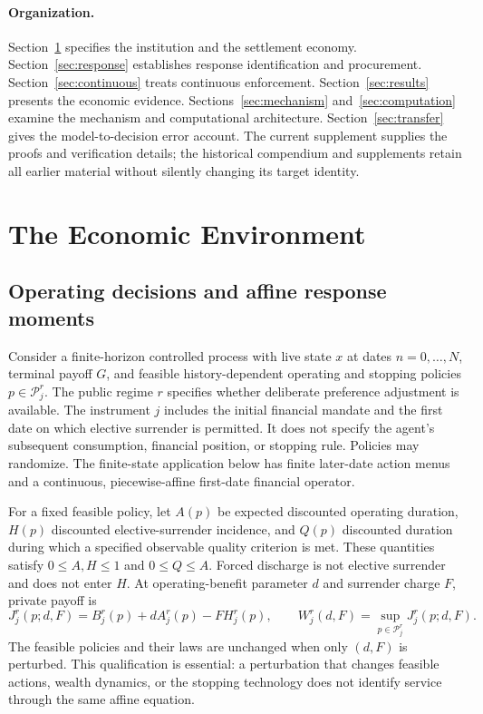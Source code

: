 \paragraph*{Organization.}
Section~\ref{sec:model} specifies the institution and the settlement economy. Section~\ref{sec:response} establishes response identification and procurement. Section~\ref{sec:continuous} treats continuous enforcement. Section~\ref{sec:results} presents the economic evidence. Sections~\ref{sec:mechanism} and~\ref{sec:computation} examine the mechanism and computational architecture. Section~\ref{sec:transfer} gives the model-to-decision error account. The current supplement supplies the proofs and verification details; the historical compendium and supplements retain all earlier material without silently changing its target identity.

\section{The Economic Environment}
\label{sec:model}
\subsection{Operating decisions and affine response moments}
Consider a finite-horizon controlled process with live state $x$ at dates $n=0,\ldots,N$, terminal payoff $G$, and feasible history-dependent operating and stopping policies $p\in\mathcal P_j^r$. The public regime $r$ specifies whether deliberate preference adjustment is available. The instrument $j$ includes the initial financial mandate and the first date on which elective surrender is permitted. It does not specify the agent's subsequent consumption, financial position, or stopping rule. Policies may randomize. The finite-state application below has finite later-date action menus and a continuous, piecewise-affine first-date financial operator.

For a fixed feasible policy, let $A(p)$ be expected discounted operating duration, $H(p)$ discounted elective-surrender incidence, and $Q(p)$ discounted duration during which a specified observable quality criterion is met. These quantities satisfy $0\leq A,H\leq1$ and $0\leq Q\leq A$. Forced discharge is not elective surrender and does not enter $H$. At operating-benefit parameter $d$ and surrender charge $F$, private payoff is
\begin{equation}
 J_j^r(p;d,F)=B_j^r(p)+dA_j^r(p)-FH_j^r(p),\qquad
 W_j^r(d,F)=\sup_{p\in\mathcal P_j^r}J_j^r(p;d,F).
 \label{eq:payoff}
\end{equation}
The feasible policies and their laws are unchanged when only $(d,F)$ is perturbed. This qualification is essential: a perturbation that changes feasible actions, wealth dynamics, or the stopping technology does not identify service through the same affine equation.

